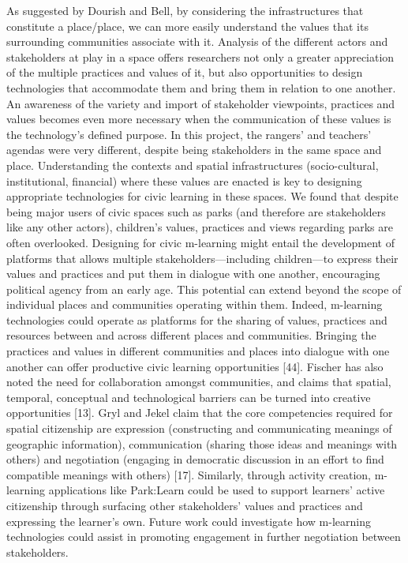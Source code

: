 As suggested by Dourish and Bell, by considering the infrastructures that constitute a place/place, we can more easily understand the values that its surrounding communities associate with it. Analysis of the different actors and stakeholders at play in a space offers researchers not only a greater appreciation of the multiple practices and values of it, but also opportunities to design technologies that accommodate them and bring them in relation to one another.
An awareness of the variety and import of stakeholder viewpoints, practices and values becomes even more necessary when the communication of these values is the technology’s defined purpose. In this project, the rangers’ and teachers’ agendas were very different, despite being stakeholders in the same space and place. Understanding the contexts and spatial infrastructures (socio-cultural, institutional, financial) where these values are enacted is key to designing appropriate technologies for civic learning in these spaces. We found that despite being major users of civic spaces such as parks (and therefore are stakeholders like any other actors), children’s values, practices and views regarding parks are often overlooked. Designing for civic m-learning might entail the development of platforms that allows multiple stakeholders—including children—to express their values and practices and put them in dialogue with one another, encouraging political agency from an early age.
This potential can extend beyond the scope of individual places and communities operating within them. Indeed, m-learning technologies could operate as platforms for the sharing of values, practices and resources between and across different places and communities.  Bringing the practices and values in different communities and places into dialogue with one another can offer productive civic learning opportunities [44].  Fischer has also noted the need for collaboration amongst communities,  and claims that spatial, temporal, conceptual and technological barriers can be turned into creative opportunities [13]. Gryl and Jekel claim that the core competencies required for spatial citizenship are expression (constructing and communicating meanings of geographic information), communication (sharing those ideas and meanings with others) and negotiation (engaging in democratic discussion in an effort to find compatible meanings with others) [17]. Similarly, through activity creation, m-learning applications like Park:Learn could be used to support learners’ active citizenship through surfacing other stakeholders’ values and practices and expressing the learner’s own. Future work could investigate how m-learning technologies could assist in promoting engagement in further negotiation between stakeholders.

